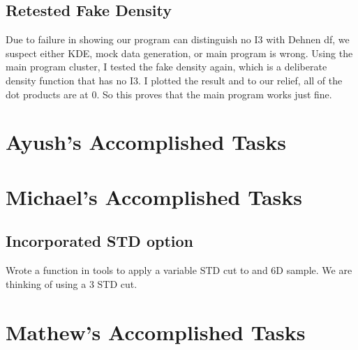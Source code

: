 \documentclass[12pt]{article}
\begin{document}
\subsection{Retested Fake Density}
Due to failure in showing our program can distinguish no I3 with Dehnen df, we suspect either KDE, mock data generation, or main program is wrong.
Using the main program cluster, I tested the fake density again, which is a deliberate density function that has no I3. I plotted the result and to our relief, all of the dot products are at 0. So this proves that the main program works just fine.

\section{Ayush’s Accomplished Tasks}


\section{Michael's Accomplished Tasks}
\subsection{Incorporated STD option}
Wrote a function in tools to apply a variable STD cut to and 6D sample. We are thinking of using a 3 STD cut.

\section{Mathew's Accomplished Tasks}
\end{document}
